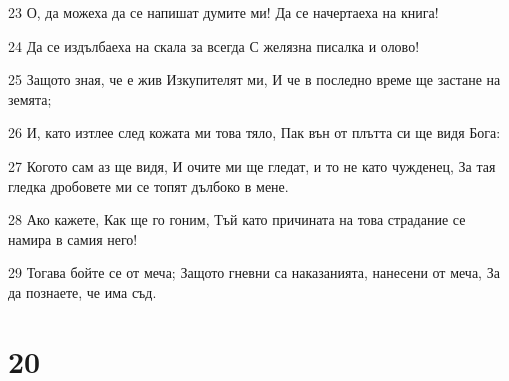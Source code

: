 \par 23 О, да можеха да се напишат думите ми! Да се начертаеха на книга!
\par 24 Да се издълбаеха на скала за всегда С желязна писалка и олово!
\par 25 Защото зная, че е жив Изкупителят ми, И че в последно време ще застане на земята;
\par 26 И, като изтлее след кожата ми това тяло, Пак вън от плътта си ще видя Бога:
\par 27 Когото сам аз ще видя, И очите ми ще гледат, и то не като чужденец, За тая гледка дробовете ми се топят дълбоко в мене.
\par 28 Ако кажете, Как ще го гоним, Тъй като причината на това страдание се намира в самия него!
\par 29 Тогава бойте се от меча; Защото гневни са наказанията, нанесени от меча, За да познаете, че има съд.

\chapter{20}

